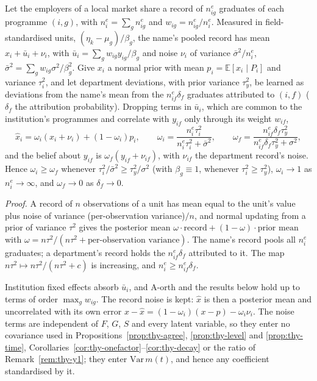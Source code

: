 \begin{thylemma}\label{lem:thy-umbrella}
Let the employers of a local market share a record of $n^e_{ig}$ graduates of each programme $(i,g)$, with
$n^e_i=\sum_gn^e_{ig}$ and $w_{ig}=n^e_{ig}/n^e_i$. Measured in field-standardised units, $(\eta_k-\mu_g)/\beta_g$, the
name's pooled record has mean $x_i+\bar u_i+\nu_i$, with $\bar u_i=\sum_gw_{ig}y_{ig}/\beta_g$ and noise $\nu_i$ of
variance $\bar\sigma^2/n^e_i$, $\bar\sigma^2=\sum_gw_{ig}\sigma^2/\beta_g^2$. Give $x_i$ a normal prior with mean
$p_i=\mathbb E[x_i\mid P_i]$ and variance $\tau_i^2$, and let department deviations, with prior variance $\tau_y^2$,
be learned as deviations from the name's mean from the $n^e_{if}\delta_f$ graduates attributed to $(i,f)$ ($\delta_f$
the attribution probability). Dropping terms in $\bar u_i$, which are common to the institution's programmes and
correlate with $y_{if}$ only through its weight $w_{if}$,
\[
\hat x_i=\omega_i(x_i+\nu_i)+(1-\omega_i)p_i,\qquad
\omega_i=\frac{n^e_i\tau_i^2}{n^e_i\tau_i^2+\bar\sigma^2},\qquad
\omega_f=\frac{n^e_{if}\delta_f\tau_y^2}{n^e_{if}\delta_f\tau_y^2+\sigma^2},
\]
and the belief about $y_{if}$ is $\omega_f(y_{if}+\nu_{if})$, with $\nu_{if}$ the department record's noise. Hence
$\omega_i\ge\omega_f$ whenever $\tau_i^2/\bar\sigma^2\ge\tau_y^2/\sigma^2$ (with $\beta_g\equiv1$, whenever
$\tau_i^2\ge\tau_y^2$), $\omega_i\to1$ as $n^e_i\to\infty$, and $\omega_f\to0$ as $\delta_f\to0$.
\end{thylemma}

\emph{Proof.} A record of $n$ observations of a unit has mean equal to the unit's value plus noise of variance
(per-observation variance)$/n$, and normal updating from a prior of variance $\tau^2$ gives the posterior mean
$\omega\cdot\text{record}+(1-\omega)\cdot\text{prior mean}$ with $\omega=n\tau^2/(n\tau^2+\text{per-observation
variance})$. The name's record pools all $n^e_i$ graduates; a department's record holds the $n^e_{if}\delta_f$
attributed to it. The map $n\tau^2\mapsto n\tau^2/(n\tau^2+c)$ is increasing, and $n^e_i\ge n^e_{if}\delta_f$.
\thyqed

Institution fixed effects absorb $\bar u_i$, and A-orth and the results below hold up to terms of order
$\max_gw_{ig}$. The record noise is kept: $\hat x$ is then a posterior mean and uncorrelated with its own error
$x-\hat x=(1-\omega_i)(x-p)-\omega_i\nu_i$. The noise terms are independent of $F$, $G$, $S$ and every latent
variable, so they enter no covariance used in Propositions~\ref{prop:thy-agree}, \ref{prop:thy-level} and
\ref{prop:thy-time}, Corollaries~\ref{cor:thy-onefactor}--\ref{cor:thy-decay} or the ratio of
Remark~\ref{rem:thy-y1}; they enter $\mathrm{Var}\,m(t)$, and hence any coefficient standardised by it.

